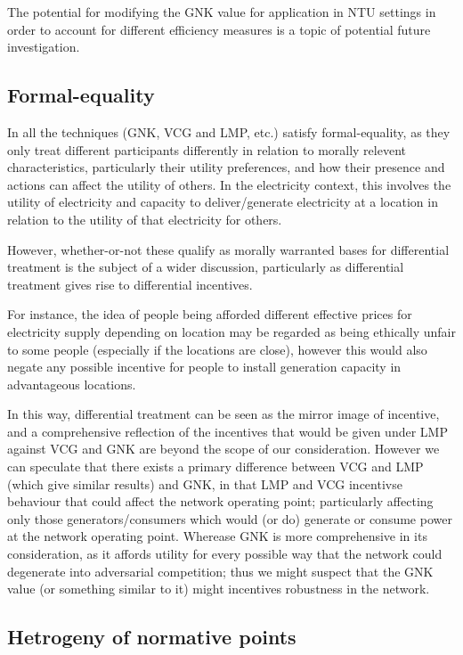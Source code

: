 The potential for modifying the GNK value for application in NTU settings in order to account for different efficiency measures is a topic of potential future investigation.

\subsection{Formal-equality}

In all the techniques (GNK, VCG and LMP, etc.) satisfy formal-equality, as they only treat different participants differently in relation to morally relevent characteristics, particularly their utility preferences, and how their presence and actions can affect the utility of others.
In the electricity context, this involves the utility of electricity and capacity to deliver/generate electricity at a location in relation to the utility of that electricity for others.

However, whether-or-not these qualify as morally warranted bases for differential treatment is the subject of a wider discussion, particularly as differential treatment gives rise to differential incentives.

For instance, the idea of people being afforded different effective prices for electricity supply depending on location may be regarded as being ethically unfair to some people (especially if the locations are close), however this would also negate any possible incentive for people to install generation capacity in advantageous locations.

In this way, differential treatment can be seen as the mirror image of incentive, and a comprehensive reflection of the incentives that would be given under LMP against VCG and GNK are beyond the scope of our consideration.
However we can speculate that there exists a primary difference between VCG and LMP (which give similar results) and GNK, in that LMP and VCG incentivse behaviour that could affect the network operating point; particularly affecting only those generators/consumers which would (or do) generate or consume power at the network operating point.
Wherease GNK is more comprehensive in its consideration, as it affords utility for every possible way that the network could degenerate into adversarial competition; thus we might suspect that the GNK value (or something similar to it) might incentives robustness in the network.

\subsection{Hetrogeny of normative points}

